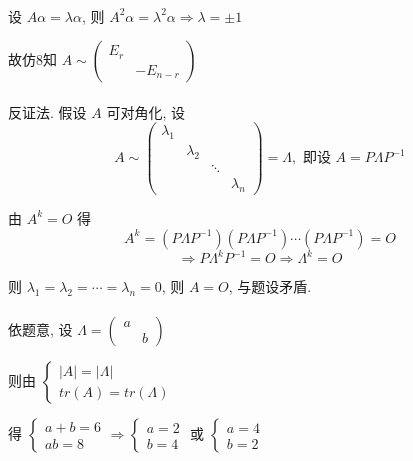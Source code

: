 	 \paragraph{} %
		 设 \( A\alpha = \lambda\alpha \), 则 \( A^{2}\alpha = \lambda^{2}\alpha \Rightarrow \lambda = \pm 1 \)

		 故仿8知 \( A \sim \begin{pmatrix}
			 E_{r} &          \\
			       & -E_{n-r}
		 \end{pmatrix} \)


	 \paragraph{} %
		 反证法. 假设 \( A \) 可对角化, 设
		 \[ A \sim \begin{pmatrix}
				 \lambda_{1} &             &                      \\
				             & \lambda_{2} &                      \\
				             &             & \ddots &             \\
				             &             &        & \lambda_{n}
			 \end{pmatrix} = \Lambda, \text{ 即设 } A = P\Lambda P^{-1} \]

		 由 \( A^{k} = O \) 得
		 \[ A^{k} = (P\Lambda P^{-1})(P\Lambda P^{-1})\cdots(P\Lambda P^{-1}) = O \]
		 \[ \Rightarrow P\Lambda^{k}P^{-1} = O \Rightarrow \Lambda^{k} = O \]

		 则 \( \lambda_{1} = \lambda_{2} = \cdots = \lambda_{n} = 0 \), 则 \( A = O \), 与题设矛盾.


	 \paragraph{} %
		 依题意, 设 \( \Lambda = \begin{pmatrix}
			 a &   \\
			   & b
		 \end{pmatrix} \)

		 则由 \( \begin{cases}
			 |A| = |\Lambda| \\
			 tr(A) = tr(\Lambda)
		 \end{cases} \)

		 得 \( \begin{cases}
			 a+b = 6 \\
			 ab = 8
		 \end{cases} \Rightarrow \begin{cases}
			 a = 2 \\
			 b = 4
		 \end{cases} \) 或 \( \begin{cases}
			 a = 4 \\
			 b = 2
		 \end{cases} \)

